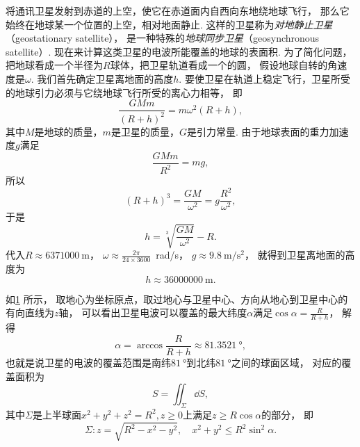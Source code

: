 \begin{example}
将通讯卫星发射到赤道的上空，使它在赤道面内自西向东地绕地球飞行，
那么它始终在地球某一个位置的上空，相对地面静止.
这样的卫星称为\emph{对地静止卫星}（geostationary satellite），
是一种特殊的\emph{地球同步卫星}（geosynchronous satellite）.
现在来计算这类卫星的电波所能覆盖的地球的表面积.
为了简化问题，把地球看成一个半径为\(R\)球体，把卫星轨道看成一个的圆，
假设地球自转的角速度是\(\omega\).
我们首先确定卫星离地面的高度\(h\).
要使卫星在轨道上稳定飞行，卫星所受的地球引力必须与它绕地球飞行所受的离心力相等，
即\[
	\frac{GMm}{(R+h)^2}
	= m \omega^2 (R+h),
\]
其中\(M\)是地球的质量，\(m\)是卫星的质量，\(G\)是引力常量.
由于地球表面的重力加速度\(g\)满足\[
	\frac{GMm}{R^2}
	= mg,
\]
所以\[
	(R+h)^3 = \frac{GM}{\omega^2}
	= g\frac{R^2}{\omega^2},
\]
于是\[
	h = \sqrt[3]{\frac{GM}{\omega^2}} - R.
\]
代入\(R \approx \qty{6371000}{\meter}\)，
\(\omega \approx \frac{2\pi}{24 \times 3600}\)~\unit[per-mode=symbol]{\radian\per\second}，
\(g \approx \qty[per-mode=symbol]{9.8}{\meter\per\second\squared}\)，
就得到卫星离地面的高度为\[
	h \approx \qty{36000000}{\meter}.
\]
\begin{figure}[htb]
	\centering
	\caption{}
	\label{figure:线积分与面积分.对地静止卫星}
\end{figure}
如\cref{figure:线积分与面积分.对地静止卫星} 所示，
取地心为坐标原点，取过地心与卫星中心、方向从地心到卫星中心的有向直线为\(z\)轴，
可以看出卫星电波可以覆盖的最大纬度\(\alpha\)满足\(\cos\alpha=\frac{R}{R+h}\)，
解得\[
	\alpha=\arccos\frac{R}{R+h} \approx \qty{81.3521}{\degree},
\]
也就是说卫星的电波的覆盖范围是南纬\(\qty{81}{\degree}\)到北纬\(\qty{81}{\degree}\)之间的球面区域，
对应的覆盖面积为\[
	S = \iint_\Sigma \dd{S},
\]
其中\(\Sigma\)是上半球面\(x^2+y^2+z^2=R^2,z\geq0\)上满足\(z \geq R\cos\alpha\)的部分，
即\[
	\Sigma: z=\sqrt{R^2-x^2-y^2}, \quad x^2+y^2 \leq R^2\sin^2\alpha.
\]
\end{example}
